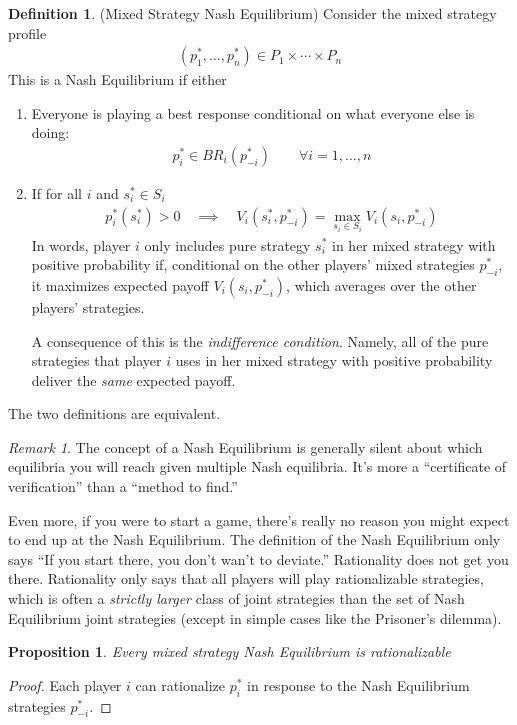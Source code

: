 \documentclass[12pt]{article}
\theoremstyle{plain}
\newtheorem{prop}[thm]{Proposition}
\theoremstyle{definition}
\newtheorem{defn}[thm]{Definition}
\theoremstyle{remark}
\newtheorem*{rmk}{Remark}
\begin{document}
\begin{defn}(Mixed Strategy Nash Equilibrium)
Consider the mixed strategy profile
\begin{align*}
  (p_1^*,\ldots, p_n^*)
  \in
  P_1\times\cdots\times P_{n}
\end{align*}
This is a Nash Equilibrium if either
\begin{enumerate}
  \item
    Everyone is playing a best response conditional on what everyone
    else is doing:
    \begin{align*}
      p^*_i \in BR_i(p_{-i}^*)
      \qquad\forall i = 1,\ldots,n
    \end{align*}

  \item
    If for all $i$ and $s_i^*\in S_i$
    \begin{align*}
      p_i^*(s^*_i)>0
      \quad\implies\quad
      V_i(s_i^*,p_{-i}^*)
      = \max_{s_i\in S_i} V_i(s_i,p_{-i}^*)
    \end{align*}
    In words, player $i$ only includes pure strategy $s_i^*$ in her
    mixed strategy with positive probability if, conditional on the
    other players' mixed strategies $p_{-i}^*$, it maximizes expected
    payoff $V_i(s_i,p_{-i}^*)$, which averages over the other players'
    strategies.

    A consequence of this is the \emph{indifference condition}. Namely,
    all of the pure strategies that player $i$ uses in her mixed
    strategy with positive probability deliver the \emph{same} expected
    payoff.
\end{enumerate}
The two definitions are equivalent.
\end{defn}
\begin{rmk}
The concept of a Nash Equilibrium is generally silent about which
equilibria you will reach given multiple Nash equilibria. It's more a
``certificate of verification'' than a ``method to find.''

Even more, if you were to start a game, there's really no reason you
might expect to end up at the Nash Equilibrium. The definition of the
Nash Equilibrium only says ``If you start there, you don't wan't to
deviate.'' Rationality does not get you there. Rationality only says
that all players will play rationalizable strategies, which is often a
\emph{strictly larger} class of joint strategies than the set of Nash
Equilibrium joint strategies (except in simple cases like the Prisoner's
dilemma).
\end{rmk}

\begin{prop}
Every mixed strategy Nash Equilibrium is rationalizable
\end{prop}
\begin{proof}
Each player $i$ can rationalize $p^*_i$ in response to the Nash
Equilibrium strategies $p^*_{-i}$.
\end{proof}



\end{document}
